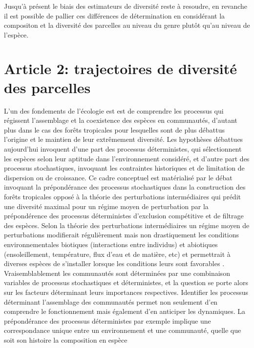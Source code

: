 \documentclass[
  11pt,
  french,
  A4paper,
  extrafontsizes,onecolumn,openright
  ]{memoir}
\begin{document}
Jusqu'à présent le biais des estimateurs de diversité reste à resoudre,
en revanche il est possible de pallier ces différences de détermination
en considérant la compositon et la diversité des parcelles au niveau du
genre plutôt qu'au niveau de l'espèce.

\chapter{Article 2: trajectoires de diversité des
parcelles}\label{article-2-trajectoires-de-diversite-des-parcelles}

L'un des fondements de l'écologie est est de comprendre les processus
qui régissent l'assemblage et la coexistence des espèces en communautés,
d'autant plus dans le cas des forêts tropicales pour lesquelles sont de
plus débattus l'origine et le maintien de leur extrêmement diversité.
Les hypothèses débattues aujourd'hui invoquent d'une part des processus
déterministes, qui sélectionnent les espèces selon leur aptitude dans
l'environnement considéré, et d'autre part des processus stochastiques,
invoquant les contraintes historiques et de limitation de dispersion ou
de croissance. Ce cadre conceptuel est matérialisé par le débat
invoquant la prépondérance des processus stochastiques dans la
construction des forêts tropicales \autocite{Hubbell1999} opposé à la
théorie des perturbations intermédiaires qui prédit une diversité
maximal pour un régime moyen de perturbation par la prépondérence des
processus déterministes d'exclusion compétitive et de filtrage des
espèces\autocite{Molino2001}. Selon la théorie des perturbations
intermédiaires un régime moyen de perturbations modifierait
régulièrement mais non drastiquement les conditions environnementales
biotiques (interactions entre individus) et abiotiques (ensoleillement,
température, flux d'eau et de matière, etc) et permettrait à diverses
espèces de s'installer lorsque les conditions leurs sont favorables
\autocites{Kariuki2006a}{Berry2008a}. Vraisemblablement les communautés
sont déterminées par une combinaison variables de processus
stochastiques et déterministes, et la question se porte alors sur les
facteurs déterminant leurs importances respectives. Identifier les
processus déterminant l'assemblage des communautés permet non seulement
d'en comprendre le fonctionnement mais également d'en anticiper les
dynamiques. La prépondérance des processus déterministes par exemple
implique une correspondance unique entre un environnement et une
communauté, quelle que soit son histoire la composition en espèce
\end{document}
